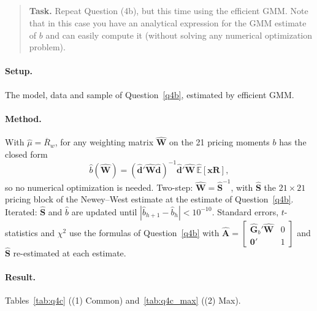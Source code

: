 \documentclass[11pt]{article}
\newcommand{\task}[1]{\begin{quote}\small\textbf{Task.} #1\end{quote}}
\begin{document}
\FloatBarrier
\subsection{}\label{q4c}
\task{Repeat Question (4b), but this time using the efficient GMM. Note that in this case you have an analytical expression for the GMM estimate of $b$ and can easily compute it (without solving any numerical optimization problem).}
\paragraph{Setup.}
The model, data and sample of Question~\ref{q4b}, estimated by efficient GMM.

\paragraph{Method.}
With $\hat{\mu} = \overline{R}_w$, for any weighting matrix $\hat{\mathbf{W}}$ on the 21 pricing moments
$b$ has the closed form
\[
  \hat{b}(\hat{\mathbf{W}}) = (\hat{\mathbf{d}}'\hat{\mathbf{W}}\hat{\mathbf{d}})^{-1}\hat{\mathbf{d}}'\hat{\mathbf{W}}\,\widehat{\mathbb{E}}[\mathbf{xR}],
\]
so no numerical optimization is needed. Two-step: $\hat{\mathbf{W}} = \hat{\mathbf{S}}^{-1}$, with
$\hat{\mathbf{S}}$ the $21 \times 21$ pricing block of the Newey--West estimate at the estimate of
Question~\ref{q4b}. Iterated: $\hat{\mathbf{S}}$ and $\hat{b}$ are updated until
$|\hat{b}_{h+1} - \hat{b}_h| < 10^{-10}$. Standard errors, $t$-statistics and $\chi^2$ use the formulas of
Question~\ref{q4b} with
$\hat{\mathbf{A}} = \begin{bmatrix} \hat{\mathbf{G}}_b'\hat{\mathbf{W}} & 0 \\ \mathbf{0}' & 1 \end{bmatrix}$
and $\hat{\mathbf{S}}$ re-estimated at each estimate.

\paragraph{Result.}
Tables~\ref{tab:q4c} ((1) Common) and~\ref{tab:q4c_max} ((2) Max).
\end{document}
